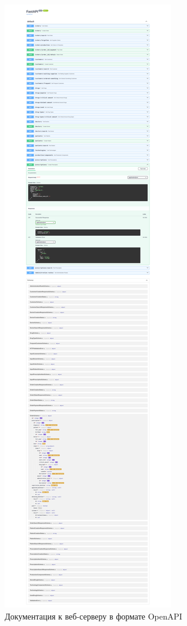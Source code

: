 \documentclass[a4paper]{article}
\begin{document}
			\begin{figure}[H]
				\centering
				\includegraphics[scale=0.1]{screens/openapi}
				\caption{Документация к веб-серверу в формате OpenAPI}
			\end{figure}
			
\end{document}
